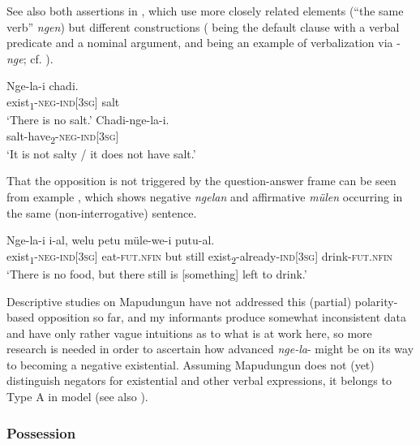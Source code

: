 \documentclass[output=paper,colorlinks,citecolor=brown,draft]{langscibook}
\begin{document}
See also both assertions in , which use more closely related elements (“the same verb” \textit{ngen}) but different constructions ( being the default clause with a verbal predicate and a nominal argument, and  being an example of verbalization via \nobreakdash-\textit{nge}; cf. ).

\ea\label{ex:mapu:11}
    \ea\label{ex:mapu:11a}
        \gll Nge-la-i chadi. \\ 
             exist\textsubscript{1}{}-\textsc{neg-ind[3sg]} salt \\
        \glt ‘There is no salt.’ \citep[125]{Smeets2008}
    \ex\label{ex:mapu:11b}
        \gll Chadi-nge-la-i. \\
             salt-have\textsubscript{2}{}-\textsc{neg-ind[3sg]} \\
        \glt ‘It is not salty / it does not have salt.’ \citep[126]{Smeets2008}
    \z
\z 

That the opposition is not triggered by the question-answer frame can be seen from example , which shows negative \textit{ngelan} and affirmative \textit{mülen} occurring in the same (non-interrogative) sentence.

\ea \label{ex:mapu:12}
    \gll Nge-la-i i-al, welu petu müle-we-i putu-al. \\
        exist\textsubscript{1}{}-\textsc{neg-ind[3sg]} eat-\textsc{fut.nfin} but still exist\textsubscript{2}{}-already-\textsc{ind[3sg]} drink-\textsc{fut.nfin}\\
    \glt ‘There is no food, but there still is [something] left to drink.’ \citep[200]{Smeets2008}
\z

Descriptive studies on Mapudungun have not addressed this (partial) polarity-based opposition so far, and my informants produce somewhat inconsistent data and have only rather vague intuitions as to what is at work here, so more research is needed in order to ascertain how advanced \textit{nge-la}- might be on its way to becoming a negative existential. Assuming Mapudungun does not (yet) distinguish negators for existential and other verbal expressions, it belongs to Type A in  model (see also \citealt{Veselinova2014}). 


\subsubsection{Possession}
\label{sec:mapu:2.3.5}
\end{document}

